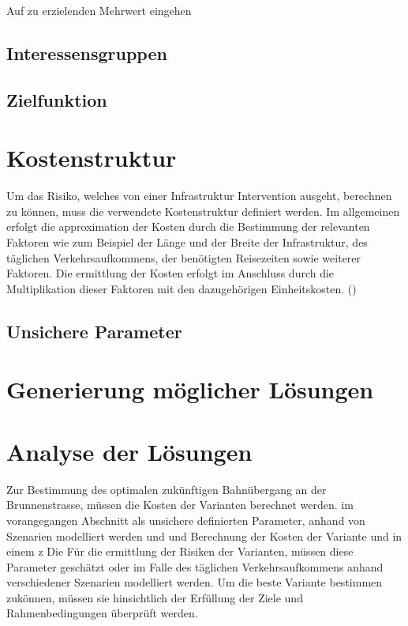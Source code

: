 Auf zu erzielenden Mehrwert eingehen

	\subsection{Interessensgruppen}
	

	\subsection{Zielfunktion}
	
	

\section{Kostenstruktur}
\label{sec:Kosten}

Um das Risiko, welches von einer Infrastruktur Intervention ausgeht, berechnen zu können, muss die verwendete Kostenstruktur definiert werden. 
Im allgemeinen erfolgt die approximation der Kosten durch die Bestimmung der relevanten Faktoren wie zum Beispiel der Länge und der Breite der Infrastruktur, des täglichen Verkehrsaufkommens, der benötigten Reisezeiten sowie weiterer Faktoren. Die ermittlung der Kosten erfolgt im Anschluss durch die Multiplikation dieser Faktoren mit den dazugehörigen Einheitskosten. (\cite{Adey2012}) 


	
	\subsection{Unsichere Parameter}
	\label{subsec:Uncertain}
	



\section{Generierung möglicher Lösungen}
\label{sec:Varianten}




\section{Analyse der Lösungen}
\label{sec:Analyse}

Zur Bestimmung des optimalen zukünftigen Bahnübergang an der Brunnenstrasse, müssen die Kosten der Varianten berechnet werden. im vorangegangen Abschnitt als unsichere definierten Parameter, anhand von Szenarien modelliert werden und  und Berechnung der Kosten der Variante und in einem z Die 
Für die ermittlung der Risiken der Varianten, müssen diese Parameter geschätzt oder im Falle des täglichen Verkehrsaufkommens anhand verschiedener Szenarien modelliert werden.
Um die beste Variante bestimmen zukönnen, müssen sie hinsichtlich der Erfüllung der Ziele und Rahmenbedingungen überprüft werden. 

